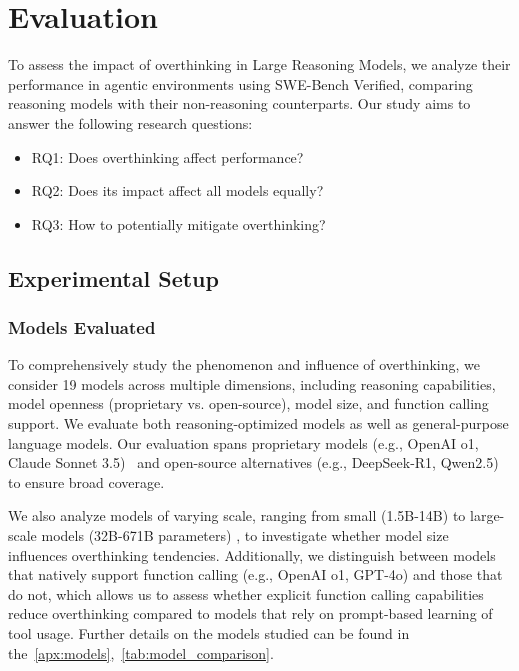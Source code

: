 \chapter{Evaluation}
\label{eval}

To assess the impact of overthinking in Large Reasoning Models, we analyze their performance in agentic environments using SWE-Bench Verified, comparing reasoning models with their non-reasoning counterparts. Our study aims to answer the following research questions:
\begin{itemize}
    \item RQ1: Does overthinking affect performance?
    \item RQ2: Does its impact affect all models equally?
    \item RQ3: How to potentially mitigate overthinking?
\end{itemize}

\section{Experimental Setup}
\label{sec:setup}

\subsection{Models Evaluated}
To comprehensively study the phenomenon and influence of overthinking, we consider 19 models across multiple dimensions, including reasoning capabilities, model openness (proprietary vs. open-source), model size, and function calling support. We evaluate both reasoning-optimized models as well as general-purpose language models. Our evaluation spans proprietary models (e.g., OpenAI o1, Claude Sonnet 3.5)~\cite{openai_learning_to_reason_2024,anthropic_claude_3_5} and open-source alternatives (e.g., DeepSeek-R1, Qwen2.5) \cite{qwen2, qwen2.5, deepseekai2025deepseekr1incentivizingreasoningcapability} to ensure broad coverage.

We also analyze models of varying scale, ranging from small (1.5B-14B) to large-scale models (32B-671B parameters) \cite{deepseek_reasoning_model}, to investigate whether model size influences overthinking tendencies. Additionally, we distinguish between models that natively support function calling (e.g., OpenAI o1, GPT-4o) \cite{openai_function_calling, openai_gpt4o_2024, openai_gpt4o_mini, openai_o1} and those that do not, which allows us to assess whether explicit function calling capabilities reduce overthinking compared to models that rely on prompt-based learning of tool usage. Further details on the models studied can be found in the~\autoref{apx:models},~\autoref{tab:model_comparison}.

